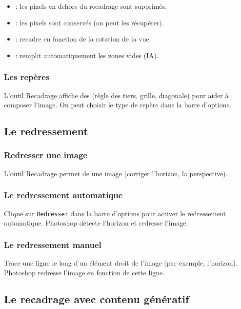 \begin{itemize}
    \item {} : les pixels en dehors du recadrage sont supprimés.
    \item {} : les pixels sont conservés (on peut les récupérer).
    \item {} : recadre en fonction de la rotation de la vue.
    \item {} : remplit automatiquement les zones vides (IA).
\end{itemize}

\subsubsection{Les repères}

L'outil Recadrage affiche des  (règle des tiers, grille, diagonale) pour aider à composer l'image. On peut choisir le type de repère dans la barre d'options.

\subsection{Le redressement}

\subsubsection{Redresser une image}

L'outil Recadrage permet de  une image (corriger l'horizon, la perspective).

\subsubsection{Le redressement automatique}

Clique sur \texttt{Redresser} dans la barre d'options pour activer le redressement automatique. Photoshop détecte l'horizon et redresse l'image.

\subsubsection{Le redressement manuel}

Trace une ligne le long d'un élément droit de l'image (par exemple, l'horizon). Photoshop redresse l'image en fonction de cette ligne.

\subsection{Le recadrage avec contenu génératif}


